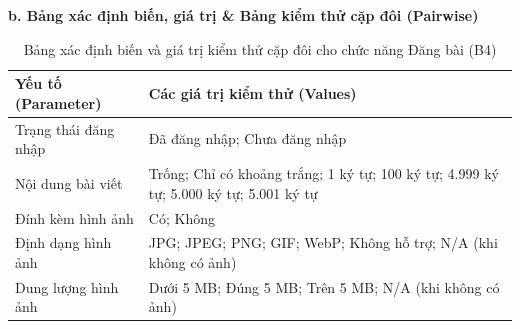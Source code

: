 \documentclass[11pt,a4paper]{article}
\begin{document}
\noindent\textbf{b. Bảng xác định biến, giá trị \& Bảng kiểm thử cặp đôi (Pairwise)}

\begin{table}[H]
\centering
\small
\begin{tabularx}{\textwidth}{|L{4.2cm}|X|}
\hline
{}
\textbf{Yếu tố (Parameter)} & \textbf{Các giá trị kiểm thử (Values)} \tabularnewline
\hline
Trạng thái đăng nhập & Đã đăng nhập; Chưa đăng nhập \\ \hline
Nội dung bài viết & Trống; Chỉ có khoảng trắng; 1 ký tự; 100 ký tự; 4.999 ký tự; 5.000 ký tự; 5.001 ký tự \\ \hline
Đính kèm hình ảnh & Có; Không \\ \hline
Định dạng hình ảnh & JPG; JPEG; PNG; GIF; WebP; Không hỗ trợ; N/A (khi không có ảnh) \\ \hline
Dung lượng hình ảnh & Dưới 5 MB; Đúng 5 MB; Trên 5 MB; N/A (khi không có ảnh) \\ \hline
\end{tabularx}
\caption{Bảng xác định biến và giá trị kiểm thử cặp đôi cho chức năng Đăng bài (B4)}
\end{table}
\end{document}
